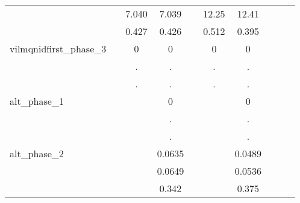 {\begin{tabular}{l*{9}{c}}
            &                     &       7.040         &       7.039         &                     &       12.25         &       12.41         &                     &                     &                     \\
            &                     &       0.427         &       0.426         &                     &       0.512         &       0.395         &                     &                     &                     \\
vilmqnidfirst\_phase\_3&                     &           0         &           0         &                     &           0         &           0         &                     &                     &                     \\
            &                     &           .         &           .         &                     &           .         &           .         &                     &                     &                     \\
            &                     &           .         &           .         &                     &           .         &           .         &                     &                     &                     \\
alt\_phase\_1 &                     &                     &           0         &                     &                     &           0         &                     &                     &                     \\
            &                     &                     &           .         &                     &                     &           .         &                     &                     &                     \\
            &                     &                     &           .         &                     &                     &           .         &                     &                     &                     \\
alt\_phase\_2 &                     &                     &      0.0635         &                     &                     &      0.0489         &                     &                     &                     \\
            &                     &                     &      0.0649         &                     &                     &      0.0536         &                     &                     &                     \\
            &                     &                     &       0.342         &                     &                     &       0.375         &                     &                     &                     \\

\end{tabular}}
